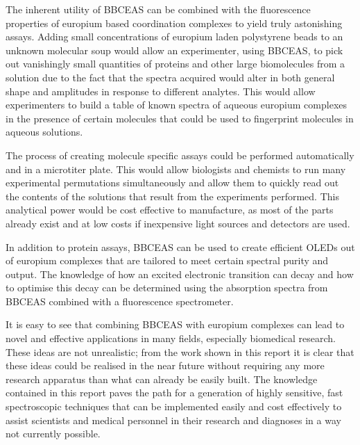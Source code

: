 The inherent utility of \ac{BBCEAS} can be combined with the fluorescence
properties of europium based coordination complexes to yield truly astonishing
assays. Adding small concentrations of europium laden polystyrene beads to
an unknown molecular soup would allow an experimenter, using \ac{BBCEAS}, to
pick out vanishingly small quantities of proteins and other large biomolecules
from a solution due to the fact that the spectra acquired would alter in both
general shape and amplitudes in response to different analytes. This would
allow experimenters to build a table of known spectra of aqueous europium
complexes in the presence of certain molecules that could be used to fingerprint molecules in aqueous solutions.

The process of creating molecule specific assays could be performed
automatically and in a microtiter plate. This would allow biologists and
chemists to run many experimental permutations simultaneously and allow
them to quickly read out the contents of the solutions that result from
the experiments performed. This analytical power would be cost effective
to manufacture, as most of the parts already exist and at low costs if
inexpensive light sources and detectors are used.

In addition to protein assays, \ac{BBCEAS} can be used to create efficient
\acp{OLED} out of europium complexes that are tailored to meet certain
spectral purity and output. The knowledge of how an excited electronic
transition can decay and how to optimise this decay can be determined
using the absorption spectra from \ac{BBCEAS} combined with a fluorescence
spectrometer.

It is easy to see that combining \ac{BBCEAS} with europium complexes can lead
to novel and effective applications in many fields, especially biomedical
research. These ideas are not unrealistic; from the work shown in this report
it is clear that these ideas could be realised in the near future without
requiring any more research apparatus than what can already be easily built.
The knowledge contained in this report paves the path for a generation of
highly sensitive, fast spectroscopic techniques that can be implemented easily
and cost effectively to assist scientists and medical personnel in their
research and diagnoses in a way not currently possible.
